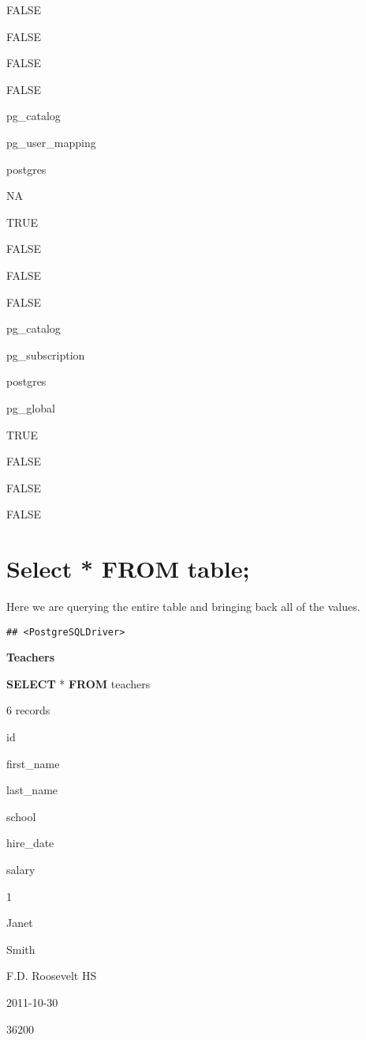 \documentclass[]{book}
\newenvironment{Shaded}{\begin{snugshade}}{\end{snugshade}}
\newcommand{\KeywordTok}[1]{\textcolor[rgb]{0.13,0.29,0.53}{\textbf{#1}}}
\newcommand{\NormalTok}[1]{#1}
\begin{document}
FALSE

FALSE

FALSE

FALSE

pg\_catalog

pg\_user\_mapping

postgres

NA

TRUE

FALSE

FALSE

FALSE

pg\_catalog

pg\_subscription

postgres

pg\_global

TRUE

FALSE

FALSE

FALSE

\chapter{Select * FROM table;}\label{select-from-table}

Here we are querying the entire table and bringing back all of the
values.

\begin{verbatim}
## <PostgreSQLDriver>
\end{verbatim}

\textbf{Teachers}

\begin{Shaded}
\begin{Highlighting}[]
\KeywordTok{SELECT}\NormalTok{ * }\KeywordTok{FROM}\NormalTok{ teachers}
\end{Highlighting}
\end{Shaded}

\label{tab:unnamed-chunk-15}6 records

id

first\_name

last\_name

school

hire\_date

salary

1

Janet

Smith

F.D. Roosevelt HS

2011-10-30

36200
\end{document}
